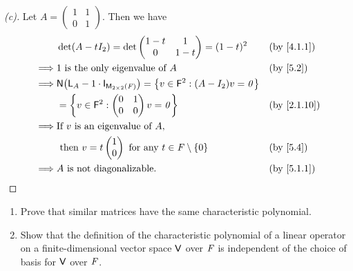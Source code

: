 \begin{proof}[(c)]
	Let \(A = \begin{pmatrix}
		1 & 1 \\
		0 & 1
	\end{pmatrix}\).
	Then we have
	\begin{align*}
		         & \det(A - t I_2) = \det\begin{pmatrix}
			                                 1 - t & 1     \\
			                                 0     & 1 - t
		                                 \end{pmatrix} = (1 - t)^2                                             &  & \by{4.1.1}         \\
		\implies & 1 \text{ is the only eigenvalue of } A                                            &  & \by{5.2}                     \\
		\implies & \ns{\L_A - 1 \cdot \IT[\ms{2}{2}{\F}]} = \set{v \in \vs{F}^2 : (A - I_2) v = \zv}                                   \\
		         & = \set{v \in \vs{F}^2 : \begin{pmatrix}
				                                   0 & 1 \\
				                                   0 & 0
			                                   \end{pmatrix} v = \zv}                                           &  & \by{2.1.10}           \\
		\implies & \text{If } v \text{ is an eigenvalue of } A,                                                                        \\
		         & \text{ then } v = t \begin{pmatrix}
			                               1 \\
			                               0
		                               \end{pmatrix} \text{ for any } t \in \F \setminus \set{0}                         &  & \by{5.4} \\
		\implies & A \text{ is not diagonalizable}.                                                  &  & \by{5.1.1}
	\end{align*}
\end{proof}

\begin{ex}\label{ex:5.1.12}
	\begin{enumerate}
		\item Prove that similar matrices have the same characteristic polynomial.
		\item Show that the definition of the characteristic polynomial of a linear operator on a finite-dimensional vector space \(\mathsf{V}\) over \(\mathit{F}\) is independent of the choice of basis for \(\mathsf{V}\) over \(\mathit{F}\).
	\end{enumerate}
\end{ex}

